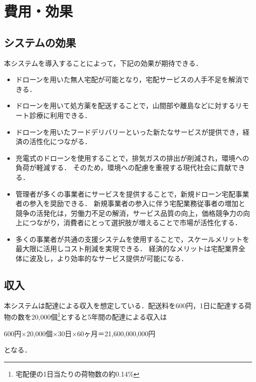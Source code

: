 \documentclass[a4paper, titlepage]{jsarticle}
\begin{document}
\section{費用・効果}
\subsection{システムの効果}
本システムを導入することによって，下記の効果が期待できる．
\begin{itemize}
  \item ドローンを用いた無人宅配が可能となり，宅配サービスの人手不足を解消できる．
  \item ドローンを用いて処方薬を配送することで，山間部や離島などに対するリモート診療に利用できる．
  \item ドローンを用いたフードデリバリーといった新たなサービスが提供でき，経済の活性化につながる．
  \item 充電式のドローンを使用することで，排気ガスの排出が削減され，環境への負荷が軽減する．
        そのため，環境への配慮を重視する現代社会に貢献できる．
  \item 管理者が多くの事業者にサービスを提供することで，新規ドローン宅配事業者の参入を奨励できる．
        新規事業者の参入に伴う宅配業務従事者の増加と競争の活発化は，労働力不足の解消，サービス品質の向上，価格競争力の向上につながり，消費者にとって選択肢が増えることで市場が活性化する．
  \item 多くの事業者が共通の支援システムを使用することで，スケールメリットを最大限に活用しコスト削減を実現できる．
        経済的なメリットは宅配業界全体に波及し，より効率的なサービス提供が可能になる．
\end{itemize}

\subsection{収入}
本システムは配達による収入を想定している．配送料を600円，1日に配達する荷物の数を20,000個\footnote{\label{fot:baggage}宅配便の1日当たりの荷物数の約0.14\%}とすると5年間の配達による収入は

\begin{center}
  600円$\times$20,000個$\times$30日$\times$60ヶ月＝21,600,000,000円
\end{center}
となる．
\end{document}
